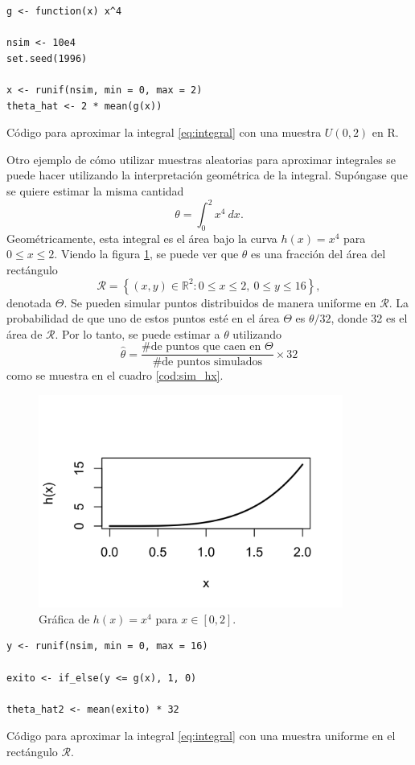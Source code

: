 \documentclass[11pt,a4paper]{article}
\begin{document}
\begin{table}[htb]
\begin{lstlisting}
g <- function(x) x^4

nsim <- 10e4
set.seed(1996)

x <- runif(nsim, min = 0, max = 2)
theta_hat <- 2 * mean(g(x))
\end{lstlisting}
\caption{Código para aproximar la integral \eqref{eq:integral} con una muestra $U(0, 2)$ en R.}
\label{cod:integral}
\end{table}

Otro ejemplo de cómo utilizar muestras aleatorias para aproximar integrales se puede hacer utilizando la interpretación geométrica de la integral. Supóngase que se quiere estimar la misma cantidad $$\theta = \int_0^2 x^4 \ dx.$$ Geométricamente, esta integral es el área bajo la curva $h(x) = x^4$ para $0 \leq x \leq 2$. Viendo la figura \ref{fig:hx}, se puede ver que $\theta$ es una fracción del área del rectángulo $$\mathcal{R} = \left\lbrace (x, y) \in \mathbb{R}^2: 0\leq x \leq 2, \ 0 \leq y \leq 16\right\rbrace,$$ denotada $\Theta$. Se pueden simular puntos distribuidos de manera uniforme en $\mathcal{R}$. La probabilidad de que uno de estos puntos esté en el área $\Theta$ es $\theta / 32$, donde 32 es el área de $\mathcal{R}.$ Por lo tanto, se puede estimar a $\theta$ utilizando $$\hat{\theta} = \frac{\text{\# de puntos que caen en }\Theta}{\text{\# de puntos simulados}} \times 32$$ como se muestra en el cuadro \ref{cod:sim_hx}.

\begin{figure}[!htb]
\centering\includegraphics[width=10cm]{hx.png}
\caption{Gráfica de $h(x) = x^4$ para $x\in [0,2]$.}
\label{fig:hx}
\end{figure}

\begin{table}[!htb]
\begin{lstlisting}
y <- runif(nsim, min = 0, max = 16)

exito <- if_else(y <= g(x), 1, 0)

theta_hat2 <- mean(exito) * 32
\end{lstlisting}
\caption{Código para aproximar la integral \eqref{eq:integral} con una muestra uniforme en el rectángulo $\mathcal{R}$.}
\label{cod:sim_hx}
\end{table}
\end{document}
